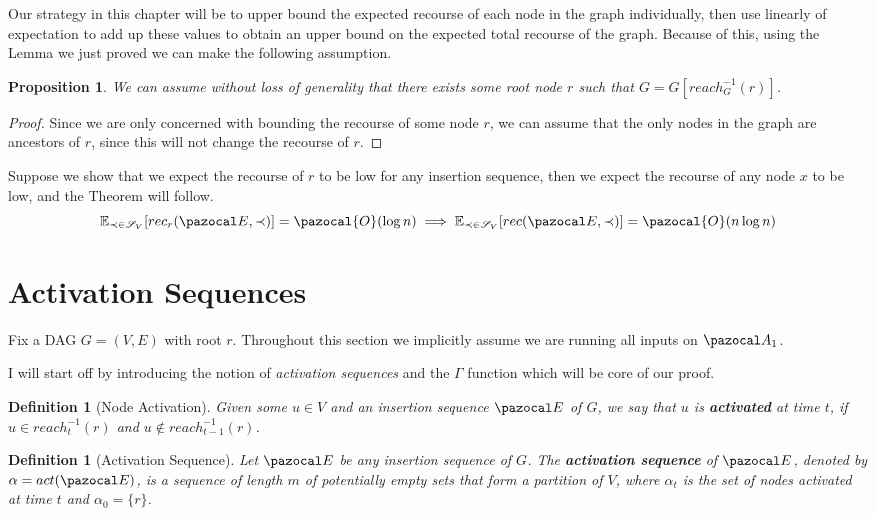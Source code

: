 \documentclass{report}
\newtheorem{proposition}[theorem]{Proposition}
\newtheorem{definition}[theorem]{Definition}
\begin{document}
Our strategy in this chapter will be to upper bound the expected recourse of each node in the graph individually, then use linearly of expectation to add up these values to obtain an upper bound on the expected total recourse of the graph. Because of this, using the Lemma we just proved we can make the following assumption.

\begin{proposition}
We can assume without loss of generality that there exists some root node $r$ such that $G = G[reach_G^{-1}(r)]$.
\end{proposition}

\begin{proof}
Since we are only concerned with bounding the recourse of some node $r$, we can assume that the only nodes in the graph are ancestors of $r$, since this will not change the recourse of $r$.
\end{proof}

Suppose we show that we expect the recourse of $r$ to be low for any insertion sequence, then we expect the recourse of any node $x$ to be low, and the Theorem will follow.
\[ \mathbb{E}_{\prec \in \mathcal{S}_V}[ rec_r(\pazocal E, \prec)] = \pazocal{O}(\log n) \implies \mathbb{E}_{\prec \in \mathcal S_V}[ rec(\pazocal E, \prec)] = \pazocal{O}(n\log n) \]

\section{Activation Sequences}

Fix a DAG $G=(V,E)$ with root $r$. Throughout this section we implicitly assume we are running all inputs on $\pazocal A_1$.

I will start off by introducing the notion of \textit{activation sequences} and the $\Gamma$ function which will be core of our proof.

\begin{definition}[Node Activation]
Given some $u \in V$ and an insertion sequence $\pazocal E$ of $G$, we say that $u$ is \textbf{activated} at time $t$, if $u \in reach^{-1}_t(r)$ and $u \notin reach^{-1}_{t-1}(r)$.
\end{definition}

\begin{definition}[Activation Sequence]
Let $\pazocal E$ be any insertion sequence of $G$. The \textbf{activation sequence} of $\pazocal E$, denoted by $\alpha = act(\pazocal E)$, is a sequence of length $m$ of potentially empty sets that form a partition of $V$, where $\alpha_t$ is the set of nodes activated at time $t$ and $\alpha_0 = \{r\}$.
\end{definition}
\end{document}
